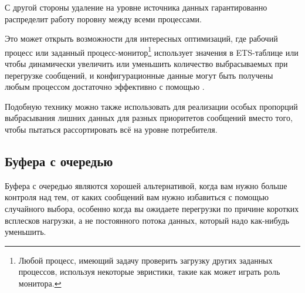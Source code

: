 С другой стороны удаление на уровне источника данных гарантированно распределит работу поровну между всеми процессами.

Это может открыть возможности для интересных оптимизаций, где рабочий процесс или заданный процесс-монитор\footnote{Любой процесс, имеющий задачу проверить загрузку других заданных процессов, используя некоторые эвристики, такие как  может играть роль монитора.} использует значения в ETS-таблице или   чтобы динамически увеличить или уменьшить количество выбрасываемых при перегрузке сообщений, и конфигурационные данные могут быть получены любым процессом достаточно эффективно с помощью .

Подобную технику можно также использовать для реализации особых пропорций выбрасывания лишних данных для разных приоритетов сообщений вместо того, чтобы пытаться рассортировать всё на уровне потребителя.


\subsection{Буфера с очередью}

Буфера с очередью являются хорошей альтернативой, когда вам нужно больше контроля над тем, от каких сообщений вам нужно избавиться с помощью случайного выбора, особенно когда вы ожидаете перегрузки по причине коротких всплесков нагрузки, а не постоянного потока данных, который надо как-нибудь уменьшить.

